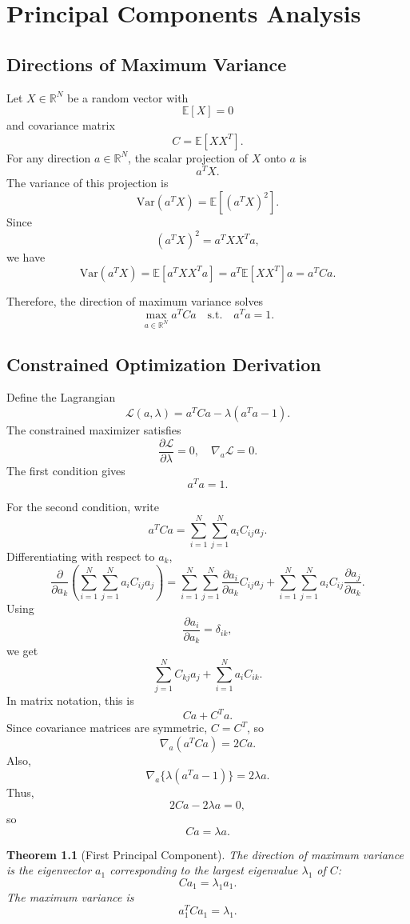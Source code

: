 \documentclass[12pt,oneside]{book}
\numberwithin{equation}{section}
\theoremstyle{definition}
\theoremstyle{plain}
\newtheorem{theorem}{Theorem}[section]
\theoremstyle{remark}
\newcommand{\R}{\mathbb{R}}
\newcommand{\E}{\mathbb{E}}
\newcommand{\Var}{\mathrm{Var}}
\newcommand{\grad}{\nabla}
\begin{document}
\chapter{Principal Components Analysis}

\section{Directions of Maximum Variance}

Let $X \in \R^N$ be a random vector with
\[
\E[X]=0
\]
and covariance matrix
\[
C=\E[XX^T].
\]
For any direction $a \in \R^N$, the scalar projection of $X$ onto $a$ is
\[
a^TX.
\]
The variance of this projection is
\[
\Var(a^TX)
=
\E[(a^TX)^2].
\]
Since
\[
(a^TX)^2 = a^TXX^Ta,
\]
we have
\[
\Var(a^TX)
=
\E[a^TXX^Ta]
=
a^T\E[XX^T]a
=
a^TCa.
\]

Therefore, the direction of maximum variance solves
\[
\max_{a \in \R^N} a^TCa
\quad
\text{s.t.}
\quad
a^Ta=1.
\]

\section{Constrained Optimization Derivation}

Define the Lagrangian
\[
\mathcal{L}(a,\lambda)
=
a^TCa-\lambda(a^Ta-1).
\]
The constrained maximizer satisfies
\[
\frac{\partial \mathcal{L}}{\partial \lambda}=0,
\quad
\grad_a \mathcal{L}=0.
\]
The first condition gives
\[
a^Ta=1.
\]

For the second condition, write
\[
a^TCa
=
\sum_{i=1}^N\sum_{j=1}^N a_i C_{ij}a_j.
\]
Differentiating with respect to $a_k$,
\[
\frac{\partial}{\partial a_k}
\left(
\sum_{i=1}^N\sum_{j=1}^N a_iC_{ij}a_j
\right)
=
\sum_{i=1}^N\sum_{j=1}^N
\frac{\partial a_i}{\partial a_k}C_{ij}a_j
+
\sum_{i=1}^N\sum_{j=1}^N
a_iC_{ij}\frac{\partial a_j}{\partial a_k}.
\]
Using
\[
\frac{\partial a_i}{\partial a_k}=\delta_{ik},
\]
we get
\[
\sum_{j=1}^N C_{kj}a_j
+
\sum_{i=1}^N a_iC_{ik}.
\]
In matrix notation, this is
\[
Ca+C^Ta.
\]
Since covariance matrices are symmetric, $C=C^T$, so
\[
\grad_a(a^TCa)=2Ca.
\]
Also,
\[
\grad_a\{\lambda(a^Ta-1)\}=2\lambda a.
\]
Thus,
\[
2Ca-2\lambda a=0,
\]
so
\[
Ca=\lambda a.
\]

\begin{theorem}[First Principal Component]
The direction of maximum variance is the eigenvector $a_1$ corresponding to the largest eigenvalue $\lambda_1$ of $C$:
\[
Ca_1=\lambda_1a_1.
\]
The maximum variance is
\[
a_1^TCa_1=\lambda_1.
\]
\end{theorem}
\end{document}
